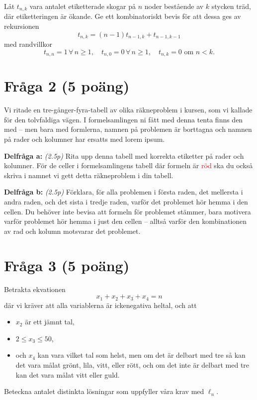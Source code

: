 \documentclass[nobib]{tufte-handout}
\begin{document}
Låt $t_{n,k}$ vara antalet etiketterade skogar på $n$ noder bestående av $k$ stycken träd, där etiketteringen är ökande. Ge ett kombinatoriskt bevis för att dessa ges av rekursionen
$$t_{n,k} = (n-1)t_{n-1,k} + t_{n-1, k-1}$$
med randvillkor
$$t_{n,n} = 1\, \forall\, n \geq 1,\quad t_{n,0} = 0\, \forall\, n \geq 1,\quad t_{n,k} = 0\text{ om }n < k.$$

\section{Fråga 2 (5 poäng)} %

Vi ritade en tre-gånger-fyra-tabell av olika räkneproblem i kursen, som vi kallade för den tolvfaldiga vägen. I formelsamlingen ni fått med denna tenta finns den med -- men bara med formlerna, namnen på problemen är borttagna och namnen på rader och kolumner har ersatts med lorem ipsum.

\textbf{Delfråga a:} \emph{(2.5p)} Rita upp denna tabell med korrekta etiketter på rader och kolumner. För de celler i formelsamlingens tabell där formeln är \textcolor{red}{röd} ska du också skriva i namnet vi gett detta räkneproblem i din tabell.

\textbf{Delfråga b:} \emph{(2.5p)} Förklara, för alla problemen i första raden, det mellersta i andra raden, och det sista i tredje raden, varför det problemet hör hemma i den cellen. Du behöver inte bevisa att formeln för problemet stämmer, bara motivera varför problemet hör hemma i just den cellen -- alltså varför den kombinationen av rad och kolumn motsvarar det problemet.

\section{Fråga 3 (5 poäng)} %

Betrakta ekvationen
$$x_1 + x_2 + x_3 + x_4 = n$$
där vi kräver att alla variablerna är ickenegativa heltal, och att
\begin{itemize}
  \item $x_2$ är ett jämnt tal,
  \item $2 \leq x_3 \leq 50$,
  \item och $x_4$ kan vara vilket tal som helst, men om det är delbart med tre så kan det vara målat grönt, lila, vitt, eller rött, och om det inte är delbart med tre kan det vara målat vitt eller guld.
\end{itemize}

Beteckna antalet distinkta lösningar som uppfyller våra krav med $\ell_n$.
\end{document}
